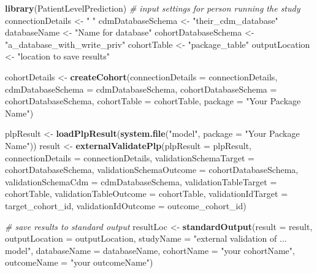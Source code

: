 \documentclass[
]{article}
\newenvironment{Shaded}{\begin{snugshade}}{\end{snugshade}}
\newcommand{\CommentTok}[1]{\textcolor[rgb]{0.56,0.35,0.01}{\textit{#1}}}
\newcommand{\DataTypeTok}[1]{\textcolor[rgb]{0.13,0.29,0.53}{#1}}
\newcommand{\KeywordTok}[1]{\textcolor[rgb]{0.13,0.29,0.53}{\textbf{#1}}}
\newcommand{\NormalTok}[1]{#1}
\newcommand{\StringTok}[1]{\textcolor[rgb]{0.31,0.60,0.02}{#1}}
\begin{document}
\begin{Shaded}
\begin{Highlighting}[]
\KeywordTok{library}\NormalTok{(PatientLevelPrediction)}
\CommentTok{# input settings for person running the study}
\NormalTok{connectionDetails <-}\StringTok{ " "}
\NormalTok{cdmDatabaseSchema <-}\StringTok{ "their_cdm_database"}
\NormalTok{databaseName <-}\StringTok{ "Name for database"}
\NormalTok{cohortDatabaseSchema <-}\StringTok{ "a_database_with_write_priv"}
\NormalTok{cohortTable <-}\StringTok{ "package_table"}
\NormalTok{outputLocation <-}\StringTok{ "location to save results"}

\NormalTok{cohortDetails <-}\StringTok{ }\KeywordTok{createCohort}\NormalTok{(}\DataTypeTok{connectionDetails =}\NormalTok{ connectionDetails, }\DataTypeTok{cdmDatabaseSchema =}\NormalTok{ cdmDatabaseSchema, }
    \DataTypeTok{cohortDatabaseSchema =}\NormalTok{ cohortDatabaseSchema, }\DataTypeTok{cohortTable =}\NormalTok{ cohortTable, }\DataTypeTok{package =} \StringTok{"Your Package Name"}\NormalTok{)}

\NormalTok{plpResult <-}\StringTok{ }\KeywordTok{loadPlpResult}\NormalTok{(}\KeywordTok{system.file}\NormalTok{(}\StringTok{"model"}\NormalTok{, }\DataTypeTok{package =} \StringTok{"Your Package Name"}\NormalTok{))}
\NormalTok{result <-}\StringTok{ }\KeywordTok{externalValidatePlp}\NormalTok{(}\DataTypeTok{plpResult =}\NormalTok{ plpResult, }\DataTypeTok{connectionDetails =}\NormalTok{ connectionDetails, }\DataTypeTok{validationSchemaTarget =}\NormalTok{ cohortDatabaseSchema, }
    \DataTypeTok{validationSchemaOutcome =}\NormalTok{ cohortDatabaseSchema, }\DataTypeTok{validationSchemaCdm =}\NormalTok{ cdmDatabaseSchema, }\DataTypeTok{validationTableTarget =}\NormalTok{ cohortTable, }
    \DataTypeTok{validationTableOutcome =}\NormalTok{ cohortTable, }\DataTypeTok{validationIdTarget =}\NormalTok{ target_cohort_id, }\DataTypeTok{validationIdOutcome =}\NormalTok{ outcome_cohort_id)}

\CommentTok{# save results to standard output}
\NormalTok{resultLoc <-}\StringTok{ }\KeywordTok{standardOutput}\NormalTok{(}\DataTypeTok{result =}\NormalTok{ result, }\DataTypeTok{outputLocation =}\NormalTok{ outputLocation, }\DataTypeTok{studyName =} \StringTok{"external validation of ... model"}\NormalTok{, }
    \DataTypeTok{databaseName =}\NormalTok{ databaseName, }\DataTypeTok{cohortName =} \StringTok{"your cohortName"}\NormalTok{, }\DataTypeTok{outcomeName =} \StringTok{"your outcomeName"}\NormalTok{)}


\end{Highlighting}
\end{Shaded}
\end{document}
